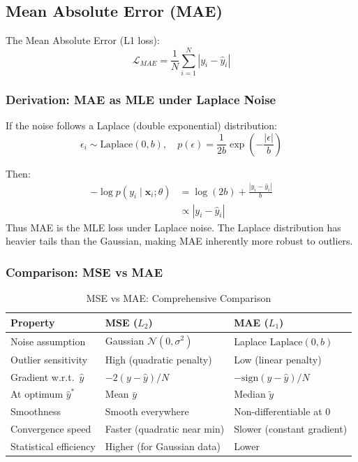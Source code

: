\subsection{Mean Absolute Error (MAE)}

The Mean Absolute Error (L1 loss):
\begin{equation}
\mathcal{L}_{MAE} = \frac{1}{N}\sum_{i=1}^{N} |y_i - \hat{y}_i|
\end{equation}

\subsubsection{Derivation: MAE as MLE under Laplace Noise}

If the noise follows a Laplace (double exponential) distribution:
\begin{equation}
\epsilon_i \sim \text{Laplace}(0, b), \quad p(\epsilon) = \frac{1}{2b}\exp\left(-\frac{|\epsilon|}{b}\right)
\end{equation}

Then:
\begin{align}
-\log p(y_i \mid \mathbf{x}_i; \theta) &= \log(2b) + \frac{|y_i - \hat{y}_i|}{b} \\
&\propto |y_i - \hat{y}_i|
\end{align}
Thus MAE is the MLE loss under Laplace noise. The Laplace distribution has heavier tails than the Gaussian, making MAE inherently more robust to outliers.

\subsubsection{Comparison: MSE vs MAE}

\begin{table}[ht]
    \centering
    \caption{MSE vs MAE: Comprehensive Comparison}
    \begin{tabular}{L{3cm} L{4cm} L{4.5cm}}
        \toprule
        \textbf{Property} & \textbf{MSE ($L_2$)} & \textbf{MAE ($L_1$)} \\
        \midrule
        Noise assumption & Gaussian $\mathcal{N}(0, \sigma^2)$ & Laplace $\text{Laplace}(0, b)$ \\
        Outlier sensitivity & High (quadratic penalty) & Low (linear penalty) \\
        Gradient w.r.t.\ $\hat{y}$ & $-2(y - \hat{y})/N$ & $-\text{sign}(y - \hat{y})/N$ \\
        At optimum $\hat{y}^*$ & Mean $\bar{y}$ & Median $\tilde{y}$ \\
        Smoothness & Smooth everywhere & Non-differentiable at 0 \\
        Convergence speed & Faster (quadratic near min) & Slower (constant gradient) \\
        Statistical efficiency & Higher (for Gaussian data) & Lower \\
        \bottomrule
    \end{tabular}
\end{table}

